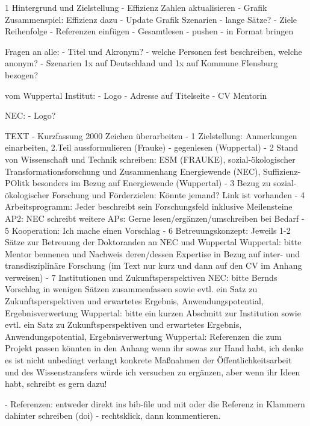 1 Hintergrund und Zielstellung
- Effizienz Zahlen aktualisieren
- Grafik Zusammenspiel: Effizienz dazu
- Update Grafik Szenarien
- lange Sätze?
- Ziele Reihenfolge
- Referenzen einfügen
- Gesamtlesen
- pushen
- in Format bringen


Fragen an alle:
- Titel und Akronym?
- welche Personen fest beschreiben, welche anonym?
- Szenarien 1x auf Deutschland und 1x auf Kommune Flensburg bezogen?

vom Wuppertal Institut:
- Logo
- Adresse auf Titelseite
- CV Mentorin


NEC:
- Logo?


TEXT
- Kurzfassung 2000 Zeichen überarbeiten
- 1 Zielstellung: Anmerkungen einarbeiten, 2.Teil aussformulieren (Frauke) - gegenlesen (Wuppertal)
- 2 Stand von Wissenschaft und Technik schreiben: ESM (FRAUKE), sozial-ökologischer Transformationsforschung und Zusammenhang Energiewende (NEC), Suffizienz-POlitk besonders im Bezug auf Energiewende (Wuppertal)
- 3 Bezug zu sozial-ökologischer Forschung und Förderzielen: Könnte jemand? Link ist vorhanden
- 4 Arbeitsprogramm:
Jeder beschreibt sein Forschungsfeld inklusive Meilensteine
AP2: NEC schreibt
weitere APs: Gerne lesen/ergänzen/umschreiben bei Bedarf
- 5 Kooperation: Ich mache einen Vorschlag
- 6 Betreuungskonzept:
Jeweils 1-2 Sätze zur Betreuung der Doktoranden an NEC und Wuppertal
Wuppertal: bitte Mentor bennenen und Nachweis deren/dessen Expertise in Bezug auf inter- und transdisziplinäre Forschung (im Text nur kurz und dann auf den CV im Anhang verweisen)
- 7 Institutionen und Zukunftsperspektiven
NEC: bitte Bernds Vorschlag in wenigen Sätzen zusammenfassen sowie evtl. ein Satz zu Zukunftsperspektiven und erwartetes Ergebnis, Anwendungspotential, Ergebnisverwertung
Wuppertal: bitte ein kurzen Abschnitt zur Institution sowie evtl. ein Satz zu Zukunftsperspektiven und erwartetes Ergebnis, Anwendungspotential, Ergebnisverwertung
Wuppertal: Referenzen die zum Projekt passen könnten in den Anhang wenn ihr sowas zur Hand habt, ich denke es ist nicht unbedingt verlangt
konkrete Maßnahmen der Öffentlichkeitsarbeit und des Wissenstransfers würde ich versuchen zu ergänzen, aber wenn ihr Ideen habt, schreibt es gern dazu!


- Referenzen: entweder direkt ins bib-file und mit \cite{}  oder die Referenz in Klammern dahinter schreiben (doi)
- rechtsklick, dann kommentieren.
